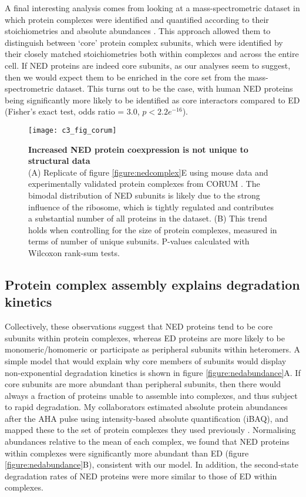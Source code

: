 \documentclass[a4paper,11pt,twoside,openright]{scrbook}
\begin{document}
A final interesting analysis comes from looking at a mass-spectrometric dataset in which protein complexes were identified and quantified according to their stoichiometries and absolute abundances \cite{Hein2015}. This approach allowed them to distinguish between `core' protein complex subunits, which were identified by their closely matched stoichiometries both within complexes and across the entire cell. If NED proteins are indeed core subunits, as our analyses seem to suggest, then we would expect them to be enriched in the core set from the mass-spectrometric dataset. This turns out to be the case, with human NED proteins being significantly more likely to be identified as core interactors compared to ED (Fisher's exact test, odds ratio = 3.0, $p < 2.2e^{-16}$).

\begin{figure}
    \texttt{[image: c3\_fig\_corum]}
    \caption[Increased NED protein coexpression is not unique to structural data]{\sffamily \textbf{Increased NED protein coexpression is not unique to structural data} \\ \small (A) Replicate of figure \ref{figure:nedcomplex}E using mouse data and experimentally validated protein complexes from CORUM \cite{Ruepp2009}. The bimodal distribution of NED subunits is likely due to the strong influence of the ribosome, which is tightly regulated and contributes a substantial number of all proteins in the dataset. (B) This trend holds when controlling for the size of protein complexes, measured in terms of number of unique subunits. P-values calculated with Wilcoxon rank-sum tests.}
    \label{figure:corum}
\end{figure}

\subsection{Protein complex assembly explains degradation kinetics}
Collectively, these observations suggest that NED proteins tend to be core subunits within protein complexes, whereas ED proteins are more likely to be monomeric/homomeric or participate as peripheral subunits within heteromers. A simple model that would explain why core members of subunits would display non-exponential degradation kinetics is shown in figure \ref{figure:nedabundance}A. If core subunits are more abundant than peripheral subunits, then there would always a fraction of proteins unable to assemble into complexes, and thus subject to rapid degradation. My collaborators estimated absolute protein abundances after the AHA pulse using intensity-based absolute quantification \cite{Schwanhausser2011} (iBAQ), and mapped these to the set of protein complexes they used previously \cite{Ori2016}. Normalising abundances relative to the mean of each complex, we found that NED proteins within complexes were significantly more abundant than ED (figure \ref{figure:nedabundance}B), consistent with our model. In addition, the second-state degradation rates of NED proteins were more similar to those of ED within complexes.
\end{document}
